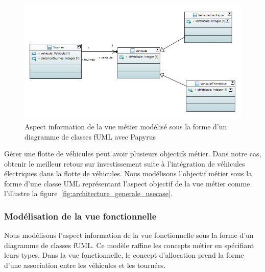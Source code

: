 \begin{figure}[!htbp]
 \begin{center}
  \includegraphics[width=1\textwidth]{figures/5_implementation/information_metier.png}
 \end{center}
 \caption{Aspect information de la vue métier modélisé sous la forme d'un diagramme de classes fUML avec Papyrus}
 \label{fig:information_metier}
\end{figure}

Gérer une flotte de véhicules peut
avoir plusieurs objectifs métier. Dans notre cas, obtenir le meilleur retour sur
investissement suite à l'intégration de véhicules électriques dans la flotte de
véhicules. Nous modélisons l'objectif métier sous la forme d'une classe UML
représentant l'aspect objectif de la vue métier comme l'illustre la 
figure~\ref{fig:architecture_generale_usecase}.

	

\subsubsection{Modélisation de la vue fonctionnelle}

Nous modélisons l'aspect information de la vue fonctionnelle sous la forme d'un diagramme de classes
fUML. Ce modèle raffine les concepts métier en spécifiant leurs types. Dans la
vue fonctionnelle, le concept d'allocation prend la forme d'une association
entre les véhicules et les tournées. 

